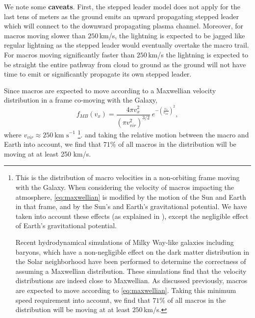 \documentclass[%
 reprint,
 amsmath,amssymb,
 aps,
]{revtex4-2}
\newcommand{\vtwo}[1]{{\color{black} #1}}
\begin{document}
        We note some \vtwo{\textbf{caveats}}. First, the stepped leader model does not apply for the last tens of meters as the ground emits an upward propagating stepped leader which will connect to the downward propagating plasma channel. Moreover, for macros moving slower than $250\,$km/s, the lightning is expected to be jagged like regular lightning as the stepped leader would eventually overtake the macro trail. For macros moving significantly faster than $250\,$km/s the lightning is expected to be straight the entire pathway from cloud to ground as the ground will not have time to emit or significantly propagate its own stepped leader. 

        Since macros are expected to move according to a Maxwellian velocity distribution in a frame co-moving with the Galaxy,
        \begin{equation}\label{eq:maxwellian}
        	f_{MB}(v_x) = 
        		\frac{4\pi v_x^2}
        		{\left({\pi v_{vir}^2}\right)^{3/2}}~
        		e^{-\left(\frac{v_x}{v_{vir}}\right)^2}, 
        \end{equation}
        where $v_{vir} \approx 250~ \text{km s}^{-1}$ \footnote{
        	This is the distribution of macro velocities in a non-orbiting frame moving with the Galaxy. When considering the velocity of macros impacting the atmosphere, \eqref{eq:maxwellian} is modified by the motion of the Sun and Earth in that frame, and by the Sun's and Earth's gravitational potential. We have taken into account these effects (as explained in \vtwo{\citet{Freese2013}}), except the negligible effect of Earth's gravitational potential.

        	Recent hydrodynamical simulations of Milky Way-like galaxies including baryons, which have a non-negligible effect on the dark matter distribution in the Solar \vtwo{neighborhood} \vtwo{\citep{Tanabashi2018}} have been performed to determine the correctness of assuming a Maxwellian distribution. These simulations find that the velocity distributions are indeed close to Maxwellian. As discussed previously, macros are expected to move according to \eqref{eq:maxwellian}. Taking this minimum speed requirement into account, we find that $71\%$ of all macros in the distribution will be moving at at least $250\,$km/s. 
    	}.
        and taking the relative motion between the macro and Earth into account, we find that $71\%$ of all macros in the distribution will be moving at at least 250 km/s.
\end{document}
